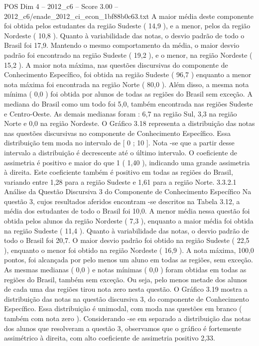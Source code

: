 \begin{textsample}{POS Dim 4 – 2012\_c6 – Score 3.00 – 2012\_c6/enade\_2012\_ci\_econ\_1bf88b0c63.txt}
A maior média deste componente foi obtida pelos estudantes da região Sudeste ( 14,9 ), e a menor, pelos da região Nordeste ( 10,8 ).
Quanto à variabilidade das notas, o desvio padrão de todo o Brasil foi 17,9.
Mantendo o mesmo comportamento da média, o maior desvio padrão foi encontrado na região Sudeste ( 19,2 ), e o menor, na região Nordeste ( 15,2 ).
A maior nota máxima, nas questões discursivas do componente de Conhecimento Específico, foi obtida na região Sudeste ( 96,7 ) enquanto a menor nota máxima foi encontrada na região Norte ( 80,0 ).
Além disso, a mesma nota mínima ( 0,0 ) foi obtida por alunos de todas as regiões do Brasil sem exceção.
A mediana do Brasil como um todo foi 5,0, também encontrada nas regiões Sudeste e Centro-Oeste.
As demais medianas foram : 6,7 na região Sul, 3,3 na região Norte e 0,0 na região Nordeste.
O Gráfico 3.18 representa a distribuição das notas nas questões discursivas no componente de Conhecimento Específico.
Essa distribuição tem moda no intervalo de [ 0 ; 10 ].
Nota -se que a partir desse intervalo a distribuição é decrescente até o último intervalo.
O coeficiente de assimetria é positivo e maior do que 1 ( 1,40 ), indicando uma grande assimetria à direita.
Este coeficiente também é positivo em todas as regiões do Brasil, variando entre 1,28 para a região Sudeste e 1,61 para a região Norte. 3.3.2.1 Análise da Questão Discursiva 3 do Componente de Conhecimento Específico Na questão 3, cujos resultados aferidos encontram -se descritos na Tabela 3.12, a média dos estudantes de todo o Brasil foi 10,0.
A menor média nessa questão foi obtida pelos alunos da região Nordeste ( 7,3 ), enquanto a maior média foi obtida na região Sudeste ( 11,4 ).
Quanto à variabilidade das notas, o desvio padrão de todo o Brasil foi 20,7.
O maior desvio padrão foi obtido na região Sudeste ( 22,5 ), enquanto o menor foi obtido na região Nordeste ( 16,9 ).
A nota máxima, 100,0 pontos, foi alcançada por pelo menos um aluno em todas as regiões, sem exceção.
As mesmas medianas ( 0,0 ) e notas mínimas ( 0,0 ) foram obtidas em todas as regiões do Brasil, também sem exceção.
Ou seja, pelo menos metade dos alunos de cada uma das regiões tirou nota zero nesta questão.
O Gráfico 3.19 mostra a distribuição das notas na questão discursiva 3, do componente de Conhecimento Específico.
Essa distribuição é unimodal, com moda nas questões em branco ( também com nota zero ).
Considerando -se em separado a distribuição das notas dos alunos que resolveram a questão 3, observamos que o gráfico é fortemente assimétrico à direita, com alto coeficiente de assimetria positivo 2,33.

\end{textsample}
